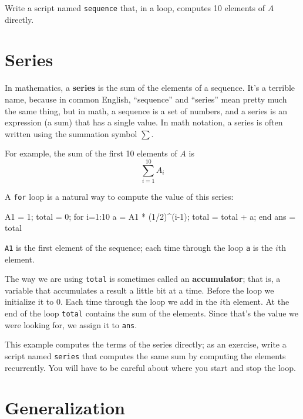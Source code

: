 \documentclass[
]{book}
\numberwithin{Answer}{chapter}
\numberwithin{Exercise}{chapter}
\begin{document}
\begin{ex}
Write a script named {\tt sequence} that, in a loop, 
computes 10 elements of $A$ directly.
\end{ex}


\section{Series}
\label{sect:series}

In mathematics, a {\bf series} is the sum of the elements of
a sequence.  It's a terrible name, because in common English,
``sequence'' and ``series'' mean pretty much the same thing, but in
math, a sequence is a set of numbers, and a series is an expression
(a sum) that has a single value.  In math notation, a series
is often written using the summation symbol $\sum$.

For example, the sum of the first 10 elements of $A$ is
\begin{equation}
\sum_{i=1}^{10} A_i
\end{equation}

A {\tt for} loop is a natural way to compute the value of this
series:

\begin{code}
A1 = 1;
total = 0;
for i=1:10
    a = A1 * (1/2)^(i-1);
    total = total + a;
end
ans = total
\end{code}

{\tt A1} is the first element of the sequence; each time
through the loop {\tt a} is the $i$th element.

The way we are using {\tt total} is sometimes called an {\bf
accumulator}; that is, a variable that accumulates a result a little
bit at a time.  
Before the loop we initialize it to 0.  
Each time
through the loop we add in the $i$th element.  
At the end of the loop
{\tt total} contains the sum of the elements.  
Since that's the value
we were looking for, we assign it to {\tt ans}.

\begin{ex}
This example computes the terms of the series directly; as
an exercise, write a script named {\tt series} that computes
the same sum by computing the elements recurrently.  You will
have to be careful about where you start and stop the loop.
\end{ex}


\section{Generalization}
\end{document}
